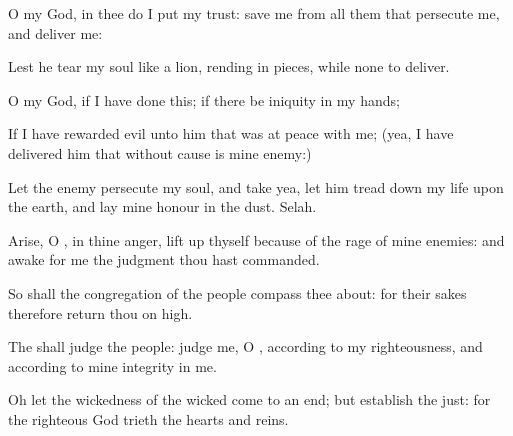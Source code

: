 {\Q {}O
{} my
God, in thee do I put my
trust:
save me from all them that
persecute me, and
deliver me:


\par }{\Q {}Lest he
tear my
soul like a
lion, rending
{} in
pieces, while
{} none to
deliver.


\par }{\Q {}O
{} my
God, if I have
done this; if there
be
iniquity in my
hands;


\par }{\Q {}If I have
rewarded
evil unto him that was at
peace with me; (yea, I have
delivered him that without
cause is mine
enemy:)


\par }{\Q {}Let the
enemy
persecute my
soul, and
take
{} yea, let him tread
down my
life upon the
earth, and
lay mine
honour in the
dust.
Selah.


\par }{\Q {}Arise, O
{}, in thine
anger, lift
up thyself because of the
rage of mine
enemies: and
awake for me
{} the
judgment
{} thou hast
commanded.


\par }{\Q {}So shall the
congregation of the
people compass thee
about: for their sakes therefore
return thou on
high.


\par }{\Q {}The
{} shall
judge the
people:
judge me, O
{}, according to my
righteousness, and according to mine
integrity
{} in me.


\par }{\Q {}Oh let the
wickedness of the
wicked come to an
end; but
establish the
just: for the
righteous
God
trieth the
hearts and
reins.


\par }{\BB \par }
